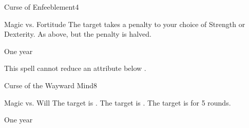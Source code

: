 \begin{spellsection}{Curse of Enfeeblement}{4}
\begin{spellheader}
\end{spellheader}
\begin{spellcontent}
    \begin{spelltargetinginfo}
    \end{spelltargetinginfo}
    \begin{spelleffects}
        \begin{spellattack}{Magic vs. Fortitude}
            \spellsuccess The target takes a  penalty to your choice of Strength or Dexterity.
            \spellfailure As above, but the penalty is halved.
        \end{spellattack}
        \spelldur One year
    \end{spelleffects}
\end{spellcontent}
\begin{spellfooter}
    \spellnotes This spell cannot reduce an attribute below . \cursespellnotes
\end{spellfooter}
\end{spellsection}

\begin{spellsection}{Curse of the Wayward Mind}{8}
\begin{spellheader}
\end{spellheader}
\begin{spellcontent}
    \begin{spelltargetinginfo}
    \end{spelltargetinginfo}
    \begin{spelleffects}
        \begin{spellattack}{Magic vs. Will}
            \spellsuccess The target is \disoriented.
            \spellcritical The target is \confused.
            \spellfailure The target is \disoriented for 5 rounds.
        \end{spellattack}
        \spelldur One year
    \end{spelleffects}
\end{spellcontent}
\begin{spellfooter}
    \spellnotes \cursespellnotes
\end{spellfooter}

\begin{comment}
\subsubsection{D}
\end{comment}
\end{spellsection}

